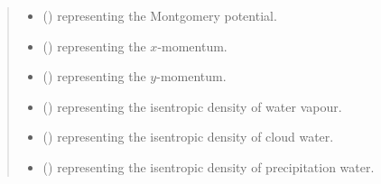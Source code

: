 \documentclass[letterpaper,10pt,english]{sphinxmanual}
\begin{document}
\begin{fulllineitems}
\begin{fulllineitems}
\begin{quote}
\begin{description}
\begin{itemize}
\item {} 
 () \textendash{}  representing the Montgomery potential.

\item {} 
 () \textendash{}  representing the \(x\)-momentum.

\item {} 
 () \textendash{}  representing the \(y\)-momentum.

\item {} 
 () \textendash{}  representing the isentropic density of water vapour.

\item {} 
 () \textendash{}  representing the isentropic density of cloud water.

\item {} 
 () \textendash{}  representing the isentropic density of precipitation water.

\end{itemize}

\end{description}\end{quote}

\end{fulllineitems}



\end{fulllineitems}
\end{document}
